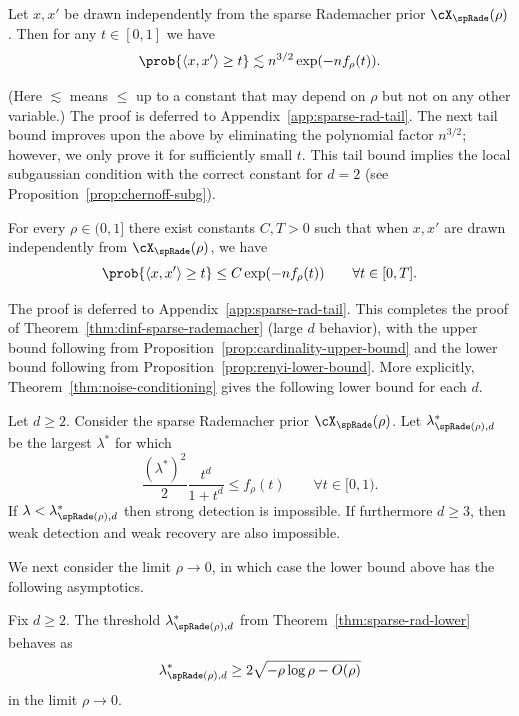 \documentclass{article}
\begin{document}
\begin{proposition}
\label{prop:sparse-tail-weak}
Let $x,x'$ be drawn independently from the sparse Rademacher prior $\cX_\spRade(\rho)$. Then for any $t \in [0,1]$ we have
$$\prob{\langle x,x' \rangle \ge t} \lesssim n^{3/2} \exp(-n f_\rho(t)).$$
\end{proposition}

\noindent (Here $\lesssim$ means $\le$ up to a constant that may depend on $\rho$ but not on any other variable.) The proof is deferred to Appendix~\ref{app:sparse-rad-tail}. The next tail bound improves upon the above by eliminating the polynomial factor $n^{3/2}$; however, we only prove it for sufficiently small $t$. This tail bound implies the local subgaussian condition with the correct constant for $d=2$ (see Proposition~\ref{prop:chernoff-subg}).

\begin{proposition}
\label{prop:sparse-tail-strong}
For every $\rho \in (0,1]$ there exist constants $C,T > 0$ such that when $x,x'$ are drawn independently from $\cX_\spRade(\rho)$, we have
$$\prob{\langle x,x' \rangle \ge t} \le C \exp(-n f_\rho(t)) \qquad \forall t \in [0,T].$$
\end{proposition}

\noindent The proof is deferred to Appendix~\ref{app:sparse-rad-tail}. This completes the proof of Theorem~\ref{thm:dinf-sparse-rademacher} (large $d$ behavior), with the upper bound following from Proposition~\ref{prop:cardinality-upper-bound} and the lower bound following from Proposition~\ref{prop:renyi-lower-bound}. More explicitly, Theorem~\ref{thm:noise-conditioning} gives the following lower bound for each $d$.

\begin{theorem}
\label{thm:sparse-rad-lower}
Let $d\ge 2$. Consider the sparse Rademacher prior $\cX_\spRade(\rho)$. Let $\lambda^*_{\spRade(\rho),d}$ be the largest $\lambda^*$ for which
$$\frac{(\lambda^*)^2}{2} \frac{t^d}{1+t^d} \le f_\rho(t) \qquad \forall t \in [0,1).$$
If $\lambda < \lambda^*_{\spRade(\rho),d}$ then strong detection is impossible. If furthermore $d \ge 3$, then weak detection and weak recovery are also impossible.
\end{theorem}



We next consider the limit $\rho \to 0$, in which case the lower bound above has the following asymptotics.

\begin{proposition}
\label{prop:sparse-rad-p0}
Fix $d\ge 2$. The threshold $\lambda^*_{\spRade(\rho),d}$ from Theorem~\ref{thm:sparse-rad-lower} behaves as
$$\lambda^*_{\spRade(\rho),d} \ge 2\sqrt{-\rho \log \rho - O(\rho)}$$
in the limit $\rho \to 0$.
\end{proposition}
\end{document}
